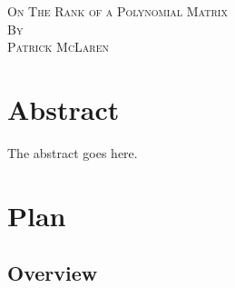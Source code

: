 \documentclass{amsart}
\theoremstyle{definition}
\theoremstyle{remark}
\numberwithin{equation}{section}
\begin{document}

\def\thetitle{On The Rank of a Polynomial Matrix}
\def\theauthor{Patrick McLaren}
\def\theemail{patrick.mclaren001@umb.edu}

\begin{titlepage}
  \begin{center}
    \textsc{\LARGE \thetitle}\\[0.75cm]
    \textsc{By}\\[0.25cm]
    \textsc{\large \theauthor}\\[1cm]
  \end{center}
\end{titlepage}


\thispagestyle{empty}

\section*{Abstract}

\begin{center}
  \begin{minipage}{0.8\textwidth}
    \small
    \begin{flushleft}
      The abstract goes here.
    \end{flushleft}
  \end{minipage}
\end{center}

\newpage


\thispagestyle{empty}

\section*{Plan}

\subsection*{Overview}
\end{document}

